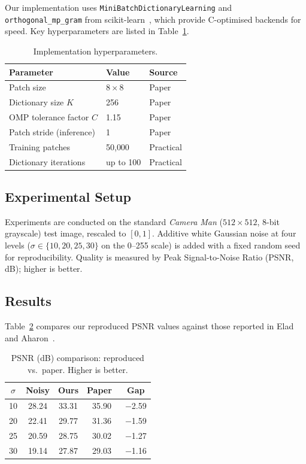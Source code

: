 \documentclass[conference]{IEEEtran}
\begin{document}
Our implementation uses \texttt{MiniBatchDictionaryLearning} and
\texttt{orthogonal\_mp\_gram} from scikit-learn~\cite{scikit-learn},
which provide C-optimised backends for speed.
Key hyperparameters are listed in Table~\ref{tab:params}.

\begin{table}[h]
\centering
\caption{Implementation hyperparameters.}
\label{tab:params}
\begin{tabular}{@{}lll@{}}
\toprule
Parameter & Value & Source \\
\midrule
Patch size                  & $8 \times 8$   & Paper \\
Dictionary size $K$         & 256            & Paper \\
OMP tolerance factor $C$    & 1.15           & Paper \\
Patch stride (inference)    & 1              & Paper \\
Training patches            & 50{,}000       & Practical \\
Dictionary iterations       & up to 100      & Practical \\
\bottomrule
\end{tabular}
\end{table}

\subsection{Experimental Setup}

Experiments are conducted on the standard \emph{Camera Man}
($512 \times 512$, 8-bit grayscale) test image, rescaled to
$[0,1]$.  Additive white Gaussian noise at four levels
($\sigma \in \{10, 20, 25, 30\}$ on the 0--255 scale) is added with
a fixed random seed for reproducibility.  Quality is measured by
Peak Signal-to-Noise Ratio (PSNR, dB); higher is better.

\subsection{Results}

Table~\ref{tab:results} compares our reproduced PSNR values against
those reported in Elad and Aharon~\cite{elad2006image}.

\begin{table}[h]
\centering
\caption{PSNR (dB) comparison: reproduced vs.\ paper.
         Higher is better.}
\label{tab:results}
\begin{tabular}{@{}ccccc@{}}
\toprule
$\sigma$ & Noisy & Ours & Paper~\cite{elad2006image} & Gap \\
\midrule
10 & 28.24 & 33.31 & 35.90 & $-$2.59 \\
20 & 22.41 & 29.77 & 31.36 & $-$1.59 \\
25 & 20.59 & 28.75 & 30.02 & $-$1.27 \\
30 & 19.14 & 27.87 & 29.03 & $-$1.16 \\
\bottomrule
\end{tabular}
\end{table}
\end{document}
